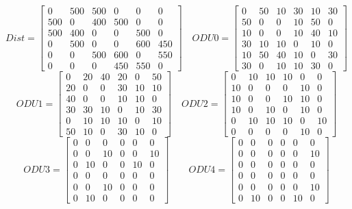 \[
Dist=
  \begin{bmatrix}
    0 & 500 & 500 & 0 & 0 & 0 \\
    500 & 0 & 400 & 500 & 0 & 0 \\
    500 & 400 & 0 & 0 & 500 & 0 \\
    0 & 500 & 0 & 0 & 600 & 450 \\
    0 & 0 & 500 & 600 & 0 & 550 \\
    0 & 0 & 0 & 450 & 550 & 0
  \end{bmatrix}
\quad ODU0=
  \begin{bmatrix}
    0 & 50 & 10 & 30 & 10 & 30 \\
    50 & 0 & 0 & 10 & 50 & 0 \\
    10 & 0 & 0 & 10 & 40 & 10 \\
    30 & 10 & 10 & 0 & 10 & 0 \\
    10 & 50 & 40 & 10 & 0 & 30 \\
    30 & 0 & 10 & 10 & 30 & 0
  \end{bmatrix}
\]
\[
ODU1=
  \begin{bmatrix}
    0 & 20 & 40 & 20 & 0 & 50 \\
    20 & 0 & 0 & 30 & 10 & 10 \\
    40 & 0 & 0 & 10 & 10 & 0 \\
    30 & 30 & 10 & 0 & 10 & 30 \\
    0 & 10 & 10 & 10 & 0 & 10 \\
    50 & 10 & 0 & 30 & 10 & 0
  \end{bmatrix}
\quad ODU2=
  \begin{bmatrix}
    0 & 10 & 10 & 10 & 0 & 0 \\
    10 & 0 & 0 & 0 & 10 & 0 \\
    10 & 0 & 0 & 10 & 10 & 0 \\
    10 & 0 & 10 & 0 & 10 & 0 \\
    0 & 10 & 10 & 10 & 0 & 10 \\
    0 & 0 & 0 & 0 & 10 & 0
  \end{bmatrix}
\]
\[
ODU3=
  \begin{bmatrix}
    0 & 0 & 0 & 0 & 0 & 0 \\
    0 & 0 & 10 & 0 & 0 & 10 \\
    0 & 10 & 0 & 0 & 10 & 0 \\
    0 & 0 & 0 & 0 & 0 & 0 \\
    0 & 0 & 10 & 0 & 0 & 0 \\
    0 & 10 & 0 & 0 & 0 & 0
  \end{bmatrix}
\qquad ODU4=
  \begin{bmatrix}
    0 & 0 & 0 & 0 & 0 & 0 \\
    0 & 0 & 0 & 0 & 0 & 10 \\
    0 & 0 & 0 & 0 & 0 & 0 \\
    0 & 0 & 0 & 0 & 0 & 0 \\
    0 & 0 & 0 & 0 & 0 & 10 \\
    0 & 10 & 0 & 0 & 10 & 0
  \end{bmatrix}
\]

